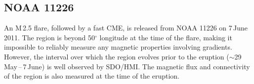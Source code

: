 
\subsection{NOAA 11226}\label{sect:noaa_11226}

An M\,2.5 flare, followed by a fast \gls{CME}, is released from NOAA 11226 on 7\,June\,2011. The region is beyond 50$^{\circ}$ longitude at the time of the flare, making it impossible to reliably measure any magnetic properties involving gradients. However, the interval over which the region evolves prior to the eruption ($\sim$29\,May\,--\,7\,June) is well observed by SDO/HMI. The magnetic flux and connectivity of the region is also measured at the time of the eruption.  
 
